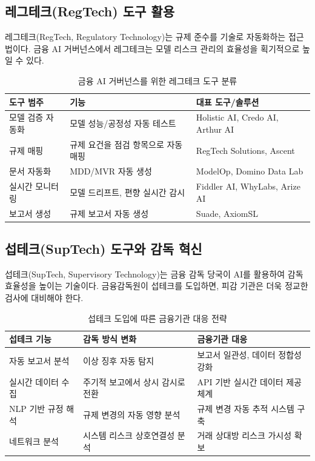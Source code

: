 \subsection{레그테크(RegTech) 도구 활용}

레그테크(RegTech, Regulatory Technology)는 규제 준수를 기술로 자동화하는 접근법이다. 금융 AI 거버넌스에서 레그테크는 모델 리스크 관리의 효율성을 획기적으로 높일 수 있다.

\begin{table}[htbp]
\centering
\caption{금융 AI 거버넌스를 위한 레그테크 도구 분류}
\label{tab:17_regtech}
\begin{tabularx}{\textwidth}{p{3cm}Xp{4cm}}
\toprule
\textbf{도구 범주} & \textbf{기능} & \textbf{대표 도구/솔루션} \\
\midrule
모델 검증 자동화 & 모델 성능/공정성 자동 테스트 & Holistic AI, Credo AI, Arthur AI \\
규제 매핑 & 규제 요건을 점검 항목으로 자동 매핑 & RegTech Solutions, Ascent \\
문서 자동화 & MDD/MVR 자동 생성 & ModelOp, Domino Data Lab \\
실시간 모니터링 & 모델 드리프트, 편향 실시간 감시 & Fiddler AI, WhyLabs, Arize AI \\
보고서 생성 & 규제 보고서 자동 생성 & Suade, AxiomSL \\
\bottomrule
\end{tabularx}
\end{table}

\subsection{섭테크(SupTech) 도구와 감독 혁신}

섭테크(SupTech, Supervisory Technology)는 금융 감독 당국이 AI를 활용하여 감독 효율성을 높이는 기술이다. 금융감독원이 섭테크를 도입하면, 피감 기관은 더욱 정교한 검사에 대비해야 한다.

\begin{table}[htbp]
\centering
\caption{섭테크 도입에 따른 금융기관 대응 전략}
\label{tab:17_suptech}
\begin{tabularx}{\textwidth}{p{3cm}Xp{4cm}}
\toprule
\textbf{섭테크 기능} & \textbf{감독 방식 변화} & \textbf{금융기관 대응} \\
\midrule
자동 보고서 분석 & 이상 징후 자동 탐지 & 보고서 일관성, 데이터 정합성 강화 \\
실시간 데이터 수집 & 주기적 보고에서 상시 감시로 전환 & API 기반 실시간 데이터 제공 체계 \\
NLP 기반 규정 해석 & 규제 변경의 자동 영향 분석 & 규제 변경 자동 추적 시스템 구축 \\
네트워크 분석 & 시스템 리스크 상호연결성 분석 & 거래 상대방 리스크 가시성 확보 \\
\bottomrule
\end{tabularx}
\end{table}

